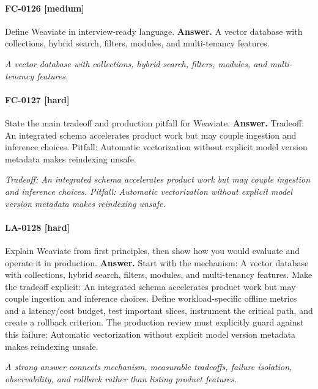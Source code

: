 \paragraph{FC-0126 [medium]} Define Weaviate in interview-ready language.
\noindent\textbf{Answer.} A vector database with collections, hybrid search, filters, modules, and multi-tenancy features.
\par\textit{A vector database with collections, hybrid search, filters, modules, and multi-tenancy features.}
\paragraph{FC-0127 [hard]} State the main tradeoff and production pitfall for Weaviate.
\noindent\textbf{Answer.} Tradeoff: An integrated schema accelerates product work but may couple ingestion and inference choices. Pitfall: Automatic vectorization without explicit model version metadata makes reindexing unsafe.
\par\textit{Tradeoff: An integrated schema accelerates product work but may couple ingestion and inference choices. Pitfall: Automatic vectorization without explicit model version metadata makes reindexing unsafe.}
\paragraph{LA-0128 [hard]} Explain Weaviate from first principles, then show how you would evaluate and operate it in production.
\noindent\textbf{Answer.} Start with the mechanism: A vector database with collections, hybrid search, filters, modules, and multi-tenancy features. Make the tradeoff explicit: An integrated schema accelerates product work but may couple ingestion and inference choices. Define workload-specific offline metrics and a latency/cost budget, test important slices, instrument the critical path, and create a rollback criterion. The production review must explicitly guard against this failure: Automatic vectorization without explicit model version metadata makes reindexing unsafe.
\par\textit{A strong answer connects mechanism, measurable tradeoffs, failure isolation, observability, and rollback rather than listing product features.}
